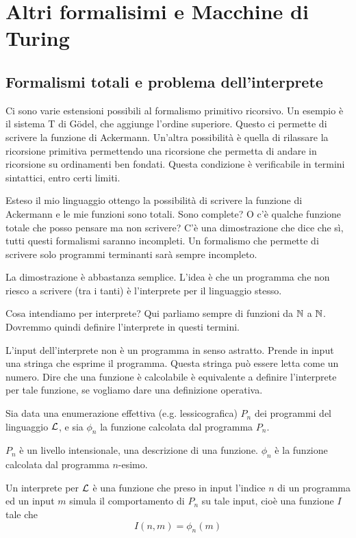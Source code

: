 \chapter{Altri formalisimi e Macchine di Turing}

\section{Formalismi totali e problema dell'interprete}

Ci sono varie estensioni possibili al formalismo primitivo ricorsivo. Un esempio è il sistema T di
Gödel, che aggiunge l'ordine superiore. Questo ci permette di scrivere la funzione di Ackermann.
Un'altra possibilità è quella di rilassare la ricorsione primitiva permettendo una ricorsione che
permetta di andare in ricorsione su ordinamenti ben fondati. Questa condizione è verificabile in
termini sintattici, entro certi limiti.

Esteso il mio linguaggio ottengo la possibilità di scrivere la funzione di Ackermann e le mie
funzioni sono totali. Sono complete? O c'è qualche funzione totale che posso pensare ma non
scrivere? C'è una dimostrazione che dice che sì, tutti questi formalismi saranno incompleti. Un
formalismo che permette di scrivere solo programmi terminanti sarà sempre incompleto.

La dimostrazione è abbastanza semplice. L'idea è che un programma che non riesco a scrivere (tra
i tanti) è l'interprete per il linguaggio stesso. 

Cosa intendiamo per interprete? Qui parliamo sempre di funzioni da $\mathbb{N}$ a $\mathbb{N}$. Dovremmo quindi
definire l'interprete in questi termini.

L'input dell'interprete non è un programma in senso astratto. Prende in input una stringa che
esprime il programma. Questa stringa può essere letta come un numero. Dire che una funzione è
calcolabile è equivalente a definire l'interprete per tale funzione, se vogliamo dare una
definizione operativa.

Sia data una enumerazione effettiva (e.g. lessicografica) $P_{n}$ dei programmi del
linguaggio $\mathcal{L}$, e sia $\phi_{n}$ la funzione calcolata dal programma $P_{n}$.

$P_{n}$ è un livello intensionale, una descrizione di una funzione. $\phi_{n}$ è la funzione
calcolata dal programma $n$-esimo.

Un interprete per $\mathcal{L}$ è una funzione che preso in input l'indice $n$ di un programma ed un
input $m$ simula il comportamento di $P_{n}$ su tale input, cioè una funzione $I$ tale che
\begin{equation*}
    I (n, m) = \phi_{n}(m)
\end{equation*}


